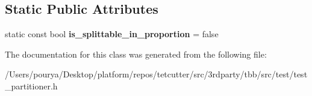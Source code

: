 \subsection*{Static Public Attributes}
\begin{DoxyCompactItemize}
\item 
\hypertarget{classtest__partitioner__utils_1_1interaction__with__range__and__partitioner_1_1Range5_adca60e50e69e124fdc1ea8c7d1eb27b0}{}static const bool {\bfseries is\+\_\+splittable\+\_\+in\+\_\+proportion} = false\label{classtest__partitioner__utils_1_1interaction__with__range__and__partitioner_1_1Range5_adca60e50e69e124fdc1ea8c7d1eb27b0}

\end{DoxyCompactItemize}


The documentation for this class was generated from the following file\+:\begin{DoxyCompactItemize}
\item 
/\+Users/pourya/\+Desktop/platform/repos/tetcutter/src/3rdparty/tbb/src/test/test\+\_\+partitioner.\+h\end{DoxyCompactItemize}
